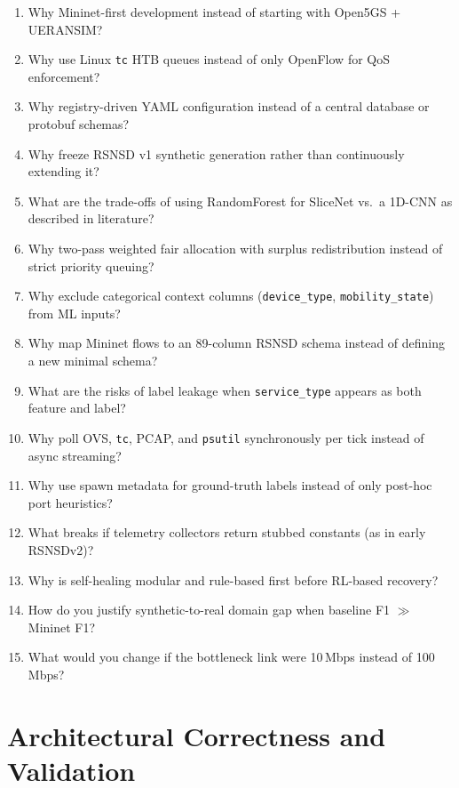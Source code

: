 \documentclass[11pt,a4paper]{article}
\begin{document}
\begin{enumerate}
    \item Why Mininet-first development instead of starting with Open5GS + UERANSIM?
    \item Why use Linux \texttt{tc} HTB queues instead of only OpenFlow for QoS enforcement?
    \item Why registry-driven YAML configuration instead of a central database or protobuf schemas?
    \item Why freeze RSNSD v1 synthetic generation rather than continuously extending it?
    \item What are the trade-offs of using RandomForest for SliceNet vs.\ a 1D-CNN as described in literature?
    \item Why two-pass weighted fair allocation with surplus redistribution instead of strict priority queuing?
    \item Why exclude categorical context columns (\texttt{device\_type}, \texttt{mobility\_state}) from ML inputs?
    \item Why map Mininet flows to an 89-column RSNSD schema instead of defining a new minimal schema?
    \item What are the risks of label leakage when \texttt{service\_type} appears as both feature and label?
    \item Why poll OVS, \texttt{tc}, PCAP, and \texttt{psutil} synchronously per tick instead of async streaming?
    \item Why use spawn metadata for ground-truth labels instead of only post-hoc port heuristics?
    \item What breaks if telemetry collectors return stubbed constants (as in early RSNSDv2)?
    \item Why is self-healing modular and rule-based first before RL-based recovery?
    \item How do you justify synthetic-to-real domain gap when baseline F1 $\gg$ Mininet F1?
    \item What would you change if the bottleneck link were 10\,Mbps instead of 100\,Mbps?
\end{enumerate}

\section{Architectural Correctness and Validation}
\end{document}
